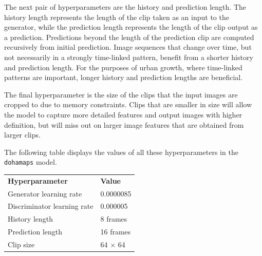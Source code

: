 \documentclass{article}
\begin{document}
The next pair of hyperparameters are the history and prediction length. The history length represents the length of the clip taken as an input to the generator, while the prediction length represents the length of the clip output as a prediction. Predictions beyond the length of the prediction clip are computed recursively from initial prediction. Image sequences that change over time, but not necessarily in a strongly time-linked pattern, benefit from a shorter history and prediction length. For the purposes of urban growth, where time-linked patterns are important, longer history and prediction lengths are beneficial.

The final hyperparameter is the size of the clips that the input images are cropped to due to memory constraints. Clips that are smaller in size will allow the model to capture more detailed features and output images with higher definition, but will miss out on larger image features that are obtained from larger clips.

The following table displays the values of all these hyperparameters in the \texttt{dohamaps} model.

\begin{table}[h]
\begin{tabular}{ll}
\textbf{Hyperparameter} & \textbf{Value}\\
Generator learning rate & 0.0000085\\
Discriminator learning rate & 0.000005\\
History length & 8 frames\\
Prediction length & 16 frames\\
Clip size & 64 $\times$ 64\\
\end{tabular}
\end{table}
\end{document}
